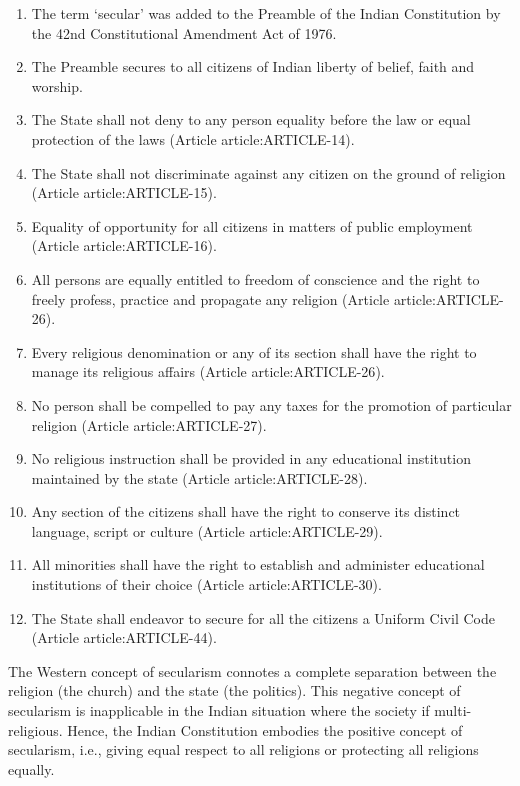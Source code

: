 \begin{multicol}{2}
\renewcommand{\labelenumi}{\textbf{(\alph{enumi})}}
\begin{enumerate}
  \item The term `secular' was added to the Preamble of the Indian Constitution by the 42nd Constitutional Amendment Act of 1976.
  \item The Preamble secures to all citizens of Indian liberty of belief, faith and worship.
  \item The State shall not deny to any person equality before the law or equal protection of the laws (Article \gls{article:ARTICLE-14}).
  \item The State shall not discriminate against any citizen on the ground of religion (Article \gls{article:ARTICLE-15}).
  \item Equality of opportunity for all citizens in matters of public employment (Article \gls{article:ARTICLE-16}).
  \item All persons are equally entitled to freedom of conscience and the right to freely profess, practice and propagate any religion (Article \gls{article:ARTICLE-26}).
  \item Every religious denomination or any of its section shall have the right to manage its religious affairs (Article \gls{article:ARTICLE-26}).
  \item No person shall be compelled to pay any taxes for the promotion of particular religion (Article \gls{article:ARTICLE-27}).
  \item No religious instruction shall be provided in any educational institution maintained by the state (Article \gls{article:ARTICLE-28}).
  \item Any section of the citizens shall have the right to conserve its distinct language, script or culture (Article \gls{article:ARTICLE-29}).
  \item All minorities shall have the right to establish and administer educational institutions of their choice (Article \gls{article:ARTICLE-30}).
  \item The State shall endeavor to secure for all the citizens a Uniform Civil Code (Article \gls{article:ARTICLE-44}).
\end{enumerate}

The Western concept of secularism connotes a complete separation between the religion (the church) and the state (the politics). This negative concept of secularism is inapplicable in the Indian situation where the society if multi-religious. Hence, the Indian Constitution embodies the positive concept of secularism, i.e., giving equal respect to all religions or protecting all religions equally.


\end{multicol}
